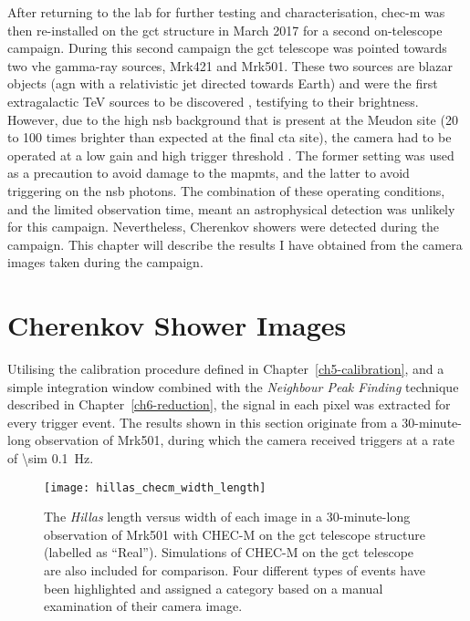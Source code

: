 After returning to the lab for further testing and characterisation, \gls{chec-m} was then re-installed on the \gls{gct} structure in March 2017 for a second on-telescope campaign. During this second campaign the \gls{gct} telescope was pointed towards two \gls{vhe} gamma-ray sources, Mrk421 and Mrk501. These two sources are blazar objects (\gls{agn} with a relativistic jet directed towards Earth) and were the first extragalactic \si{TeV} sources to be discovered \cite{Punch1992, Quinn1996}, testifying to their brightness. However, due to the high \gls{nsb} background that is present at the Meudon site (20 to 100 times brighter than expected at the final \gls{cta} site), the camera had to be operated at a low gain and high trigger threshold \cite{Zorn2017}. The former setting was used as a precaution to avoid damage to the \glspl{mapmt}, and the latter to avoid triggering on the \gls{nsb} photons. The combination of these operating conditions, and the limited observation time, meant an astrophysical detection was unlikely for this campaign. Nevertheless, Cherenkov showers were detected during the campaign. This chapter will describe the results I have obtained from the camera images taken during the campaign.

\section{Cherenkov Shower Images}

Utilising the calibration procedure defined in Chapter~\ref{ch5-calibration}, and a simple integration window combined with the \textit{Neighbour Peak Finding} technique described in Chapter~\ref{ch6-reduction}, the signal in each pixel was extracted for every trigger event. The results shown in this section originate from a 30-minute-long observation of Mrk501, during which the camera received triggers at a rate of \SI{\sim 0.1}{Hz}.

\begin{figure}
  \centering
  \texttt{[image: hillas\_checm\_width\_length]}
  \caption[\textit{Hillas} length versus width for an on-sky observation run with CHEC-M.]{The \textit{Hillas} length versus width of each image in a 30-minute-long observation of Mrk501 with CHEC-M on the \gls{gct} telescope structure (labelled as ``Real''). Simulations of CHEC-M on the \gls{gct} telescope are also included for comparison. Four different types of events have been highlighted and assigned a category based on a manual examination of their camera image.}
  \label{fig:hillas_checm_width_length}
\end{figure}

